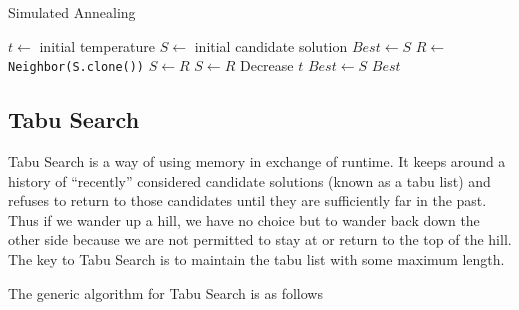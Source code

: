                     \begin{algorithm}[!htp]
                        \centering
                        \caption{Simulated Annealing}
                        \begin{algorithmic}[1]
                            \State $t \gets$ initial temperature
                            \State $S \gets$ initial candidate solution
                            \State $Best \gets S$
                                \State $R \gets$ \texttt{Neighbor(S.clone())}
                                    \State $S \gets R$
                                    \State $S \gets R$
                                \EndIf
                                \State Decrease $t$
                                    \State $Best \gets S$
                                \EndIf
                            \EndWhile
                            \State \Return $Best$
                        \end{algorithmic}
                    \end{algorithm}

            \subsection{Tabu Search}
                    Tabu Search is a way of using memory in exchange of runtime. It keeps around a history of ``recently'' considered candidate solutions (known as a tabu list) and refuses to return to those candidates until they are sufficiently far in the past. Thus if we wander up a hill, we have no choice but to wander back down the other side because we are not permitted to stay at or return to the top of the hill. The key to Tabu Search is to maintain the tabu list with some maximum length. 

                    The generic algorithm for Tabu Search is as follows

